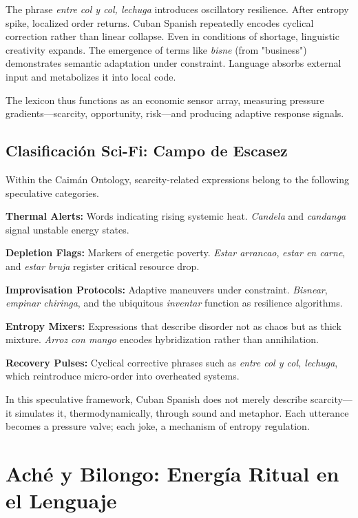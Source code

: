 \documentclass[12pt]{article}
\begin{document}
The phrase \textit{entre col y col, lechuga} introduces oscillatory resilience. After entropy spike, localized order returns. Cuban Spanish repeatedly encodes cyclical correction rather than linear collapse. Even in conditions of shortage, linguistic creativity expands. The emergence of terms like \textit{bisne} (from "business") demonstrates semantic adaptation under constraint. Language absorbs external input and metabolizes it into local code.

The lexicon thus functions as an economic sensor array, measuring pressure gradients---scarcity, opportunity, risk---and producing adaptive response signals.

\subsection*{Clasificación Sci-Fi: Campo de Escasez}

Within the Caimán Ontology, scarcity-related expressions belong to the following speculative categories.

\textbf{Thermal Alerts:} Words indicating rising systemic heat. \textit{Candela} and \textit{candanga} signal unstable energy states.

\textbf{Depletion Flags:} Markers of energetic poverty. \textit{Estar arrancao}, \textit{estar en carne}, and \textit{estar bruja} register critical resource drop.

\textbf{Improvisation Protocols:} Adaptive maneuvers under constraint. \textit{Bisnear}, \textit{empinar chiringa}, and the ubiquitous \textit{inventar} function as resilience algorithms.

\textbf{Entropy Mixers:} Expressions that describe disorder not as chaos but as thick mixture. \textit{Arroz con mango} encodes hybridization rather than annihilation.

\textbf{Recovery Pulses:} Cyclical corrective phrases such as \textit{entre col y col, lechuga}, which reintroduce micro-order into overheated systems.

In this speculative framework, Cuban Spanish does not merely describe scarcity---it simulates it, thermodynamically, through sound and metaphor. Each utterance becomes a pressure valve; each joke, a mechanism of entropy regulation.

\section{Aché y Bilongo: Energía Ritual en el Lenguaje}
\end{document}
